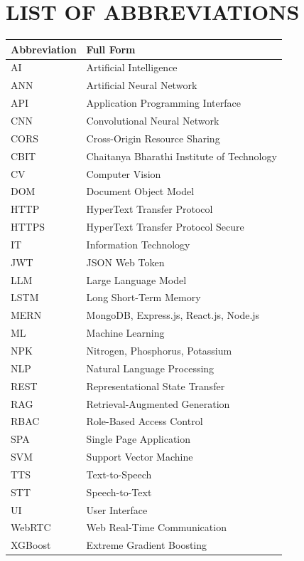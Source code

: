 \documentclass[12pt,a4paper]{report}
\begin{document}
\chapter*{LIST OF ABBREVIATIONS}
\begin{longtable}{@{}p{} p{}@{}}
\toprule
\textbf{Abbreviation} & \textbf{Full Form} \\ \midrule
\endhead
AI & Artificial Intelligence \\
ANN & Artificial Neural Network \\
API & Application Programming Interface \\
CNN & Convolutional Neural Network \\
CORS & Cross-Origin Resource Sharing \\
CBIT & Chaitanya Bharathi Institute of Technology \\
CV & Computer Vision \\
DOM & Document Object Model \\
HTTP & HyperText Transfer Protocol \\
HTTPS & HyperText Transfer Protocol Secure \\
IT & Information Technology \\
JWT & JSON Web Token \\
LLM & Large Language Model \\
LSTM & Long Short-Term Memory \\
MERN & MongoDB, Express.js, React.js, Node.js \\
ML & Machine Learning \\
NPK & Nitrogen, Phosphorus, Potassium \\
NLP & Natural Language Processing \\
REST & Representational State Transfer \\
RAG & Retrieval-Augmented Generation \\
RBAC & Role-Based Access Control \\
SPA & Single Page Application \\
SVM & Support Vector Machine \\
TTS & Text-to-Speech \\
STT & Speech-to-Text \\
UI & User Interface \\
WebRTC & Web Real-Time Communication \\
XGBoost & Extreme Gradient Boosting \\ \bottomrule
\end{longtable}
\end{document}
